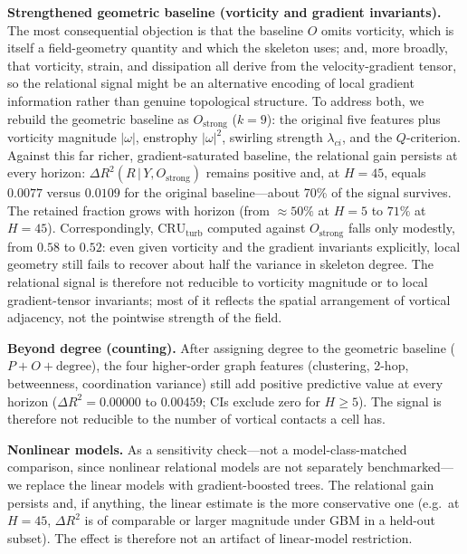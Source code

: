 \documentclass[11pt,a4paper]{article}
\begin{document}
\textbf{Strengthened geometric baseline (vorticity and gradient invariants).} The most consequential objection is that the baseline $O$ omits vorticity, which is itself a field-geometry quantity and which the skeleton uses; and, more broadly, that vorticity, strain, and dissipation all derive from the velocity-gradient tensor, so the relational signal might be an alternative encoding of local gradient information rather than genuine topological structure. To address both, we rebuild the geometric baseline as $O_{\text{strong}}$ ($k=9$): the original five features plus vorticity magnitude $|\omega|$, enstrophy $|\omega|^2$, swirling strength $\lambda_{ci}$, and the $Q$-criterion. Against this far richer, gradient-saturated baseline, the relational gain persists at every horizon: $\Delta R^2(R\,|\,Y,O_{\text{strong}})$ remains positive and, at $H=45$, equals $0.0077$ versus $0.0109$ for the original baseline---about 70\% of the signal survives. The retained fraction grows with horizon (from $\approx 50\%$ at $H=5$ to $71\%$ at $H=45$). Correspondingly, $\mathrm{CRU}_{\text{turb}}$ computed against $O_{\text{strong}}$ falls only modestly, from $0.58$ to $0.52$: even given vorticity and the gradient invariants explicitly, local geometry still fails to recover about half the variance in skeleton degree. The relational signal is therefore not reducible to vorticity magnitude or to local gradient-tensor invariants; most of it reflects the spatial arrangement of vortical adjacency, not the pointwise strength of the field.

\textbf{Beyond degree (counting).} After assigning degree to the geometric baseline ($P{+}O{+}\text{degree}$), the four higher-order graph features (clustering, 2-hop, betweenness, coordination variance) still add positive predictive value at every horizon ($\Delta R^2 = 0.00000$ to $0.00459$; CIs exclude zero for $H \geq 5$). The signal is therefore not reducible to the number of vortical contacts a cell has.

\textbf{Nonlinear models.} As a sensitivity check---not a model-class-matched comparison, since nonlinear relational models are not separately benchmarked---we replace the linear models with gradient-boosted trees. The relational gain persists and, if anything, the linear estimate is the more conservative one (e.g.\ at $H=45$, $\Delta R^2$ is of comparable or larger magnitude under GBM in a held-out subset). The effect is therefore not an artifact of linear-model restriction.
\end{document}
